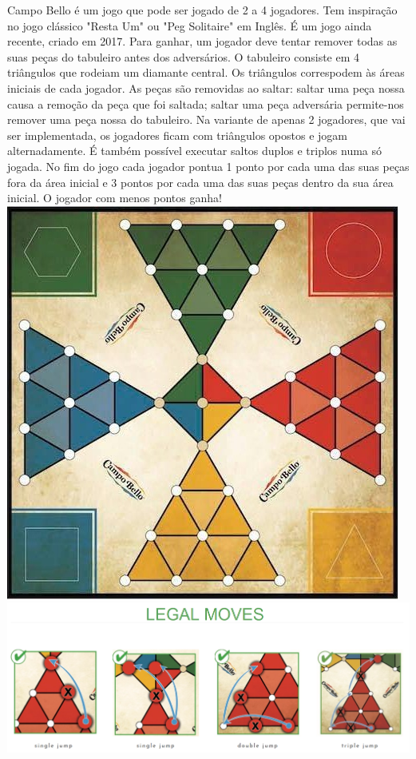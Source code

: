 \documentclass[a4paper]{article}
\begin{document}
Campo Bello é um jogo que pode ser jogado de 2 a 4 jogadores. Tem inspiração no jogo clássico "Resta Um" ou "Peg Solitaire" em Inglês. É um jogo ainda recente, criado em 2017.
Para ganhar, um jogador deve tentar remover todas as suas peças do tabuleiro antes dos adversários.
O tabuleiro consiste em 4 triângulos que rodeiam um diamante central. Os triângulos correspodem às áreas iniciais de cada jogador. As peças são removidas ao saltar:  saltar uma peça nossa causa a remoção da peça que foi saltada; saltar uma peça adversária permite-nos remover uma peça nossa do tabuleiro.
Na variante de apenas 2 jogadores, que vai ser implementada, os jogadores ficam com triângulos opostos e jogam alternadamente.
É também possível executar saltos duplos e triplos numa só jogada.
No fim do jogo cada jogador pontua 1 ponto por cada uma das suas peças fora da área inicial e 3 pontos por cada uma das suas peças dentro da sua área inicial.
O jogador com menos pontos ganha!\linebreak\linebreak
\includegraphics[scale=0.9]{originalBoard.png}\linebreak\linebreak
\includegraphics[scale=0.3]{legalMoves.PNG}\linebreak\linebreak
\end{document}
